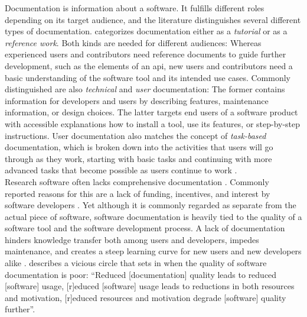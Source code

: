 Documentation is information about a software.
It fulfills different roles depending on its target audience, and the literature distinguishes several different types of documentation.
\citet{Parnas2011} categorizes documentation either as a \textit{tutorial} or as a \textit{reference work}.
Both kinds are needed for different audiences: Whereas experienced users and contributors need reference documents to guide further development, such as the elements of an \gls{api}, new users and contributors need a basic understanding of the software tool and its intended use cases.
Commonly distinguished are also \textit{technical} and \textit{user} documentation: The former contains information for developers and users by describing features, maintenance information, or design choices.
The latter targets end users of a software product with accessible explanations how to install a tool, use its features, or step-by-step instructions. %
User documentation also matches the concept of \textit{task-based} documentation, which is broken down into the activities that users will go through as they work, starting with basic tasks and continuing with more advanced tasks that become possible as users continue to work \citep{barker2003software}. \\
Research software often lacks comprehensive documentation \citep{segal2007some, pawlik2012documentation}.
Commonly reported reasons for this are a lack of funding, incentives, and interest by software developers \citep{pawlik2012documentation}.
Yet although it is commonly regarded as separate from the actual piece of software, software documentation is heavily tied to the quality of a software tool and the software development process.
A lack of documentation hinders knowledge transfer both among users and developers, impedes maintenance, and creates a steep learning curve for new users and new developers alike \citep{theunissen}.
\citet{Parnas2011} describes a vicious circle that sets in when the quality of software documentation is poor:
``Reduced [documentation] quality leads to reduced [software] usage, [r]educed [software] usage leads to reductions in both resources and motivation, [r]educed resources and motivation degrade [software] quality further''.

